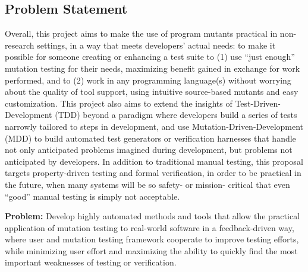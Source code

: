 
\subsection{Problem Statement}

Overall, this project aims to make the use of program mutants practical in
non-research settings, in a way that meets developers' actual needs: to make it
possible for someone creating or enhancing a test suite to (1) use ``just
enough'' mutation testing for their needs, maximizing benefit gained in exchange
for work performed, and to (2) work in any programming language(s) without worrying
about the quality of tool support, using intuitive source-based
mutants and easy customization.  This project also aims to extend the insights of
Test-Driven-Development (TDD) 
beyond a paradigm where developers build a series of tests narrowly tailored to
steps in development, and use Mutation-Driven-Development (MDD) to build
automated test generators or verification harnesses that handle not only
anticipated problems imagined during development, but problems not anticipated
by developers.  In addition to traditional manual testing, this proposal targets
property-driven testing and formal verification, in
order to be practical in the future, when many systems will be so
safety- or mission- critical that even ``good'' manual testing is simply not 
acceptable.


\begin{framed} {\bf Problem:} Develop highly automated methods and tools that
  allow the practical application of mutation testing to real-world software in
  a feedback-driven way, where user and mutation testing framework cooperate to
  improve testing efforts, while minimizing user effort and maximizing the
  ability to quickly find the most important weaknesses of testing or
  verification.
\end{framed}



